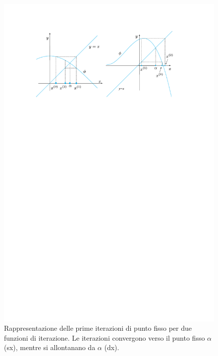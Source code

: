 \begin{figure}[!htp]
    \centering
    \includegraphics[width=\textwidth]{img/iterazioni-di-punto-fisso-2.pdf}
    \caption{Rappresentazione delle prime iterazioni di punto fisso per due funzioni di iterazione. Le iterazioni convergono verso il punto fisso $\alpha$ (sx), mentre si allontanano da $\alpha$ (dx).}
    \label{fig: interpretazione geometrica di un punto fisso}
\end{figure}